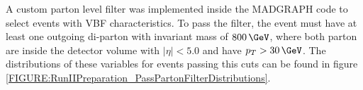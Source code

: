 A custom parton level filter was implemented inside the \textsc{MADGRAPH} code to select events with \gls{VBF} characteristics. To pass the filter, the event must have at least one outgoing di-parton with invariant mass of $800\,\GeV$, where both parton are inside the detector volume with $|\eta|<5.0$ and have $p_{T}>30\,\GeV$. The distributions of these variables for events passing this cuts can be found in figure \ref{FIGURE:RunIIPreparation_PassPartonFilterDistributions}.

\begin{figure}[!htp]%
\centering
{}\qquad
{}\\
\qquad
{}\\

\end{figure}
